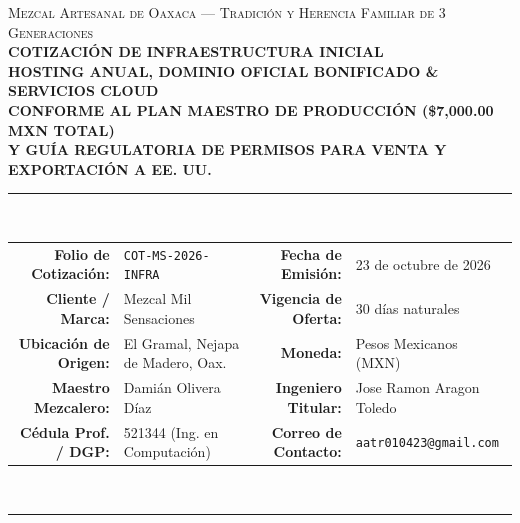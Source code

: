 \documentclass[11pt,letterpaper]{article}
\begin{document}
\begin{center}
    {\scshape\small Mezcal Artesanal de Oaxaca — Tradición y Herencia Familiar de 3 Generaciones}\\[0.15cm]
    {\LARGE\textbf{\color{MezcalAgave}COTIZACIÓN DE INFRAESTRUCTURA INICIAL}}\\[0.1cm]
    {\Large\textbf{\color{MezcalGold}HOSTING ANUAL, DOMINIO OFICIAL BONIFICADO \& SERVICIOS CLOUD}}\\[0.1cm]
    {\normalsize\textbf{\color{MezcalEarth}CONFORME AL PLAN MAESTRO DE PRODUCCIÓN (\$7,000.00 MXN TOTAL)}}\\[0.15cm]
    {\footnotesize\textbf{\color{gray}Y GUÍA REGULATORIA DE PERMISOS PARA VENTA Y EXPORTACIÓN A EE. UU.}}\\[0.25cm]
    \rule{\textwidth}{1.2pt}\\[0.15cm]
    \footnotesize
    \begin{tabularx}{\textwidth}{rX rX}
        \textbf{Folio de Cotización:} & \texttt{COT-MS-2026-INFRA} & \textbf{Fecha de Emisión:} & 23 de octubre de 2026 \\
        \textbf{Cliente / Marca:} & Mezcal Mil Sensaciones & \textbf{Vigencia de Oferta:} & 30 días naturales \\
        \textbf{Ubicación de Origen:} & El Gramal, Nejapa de Madero, Oax. & \textbf{Moneda:} & Pesos Mexicanos (MXN) \\
        \textbf{Maestro Mezcalero:} & Damián Olivera Díaz & \textbf{Ingeniero Titular:} & Jose Ramon Aragon Toledo \\
        \textbf{Cédula Prof. / DGP:} & 521344 (Ing. en Computación) & \textbf{Correo de Contacto:} & \texttt{aatr010423@gmail.com} \\
    \end{tabularx}
    \\[0.15cm]
    \rule{\textwidth}{1.2pt}
\end{center}

\vspace{0.15cm}
\end{document}
